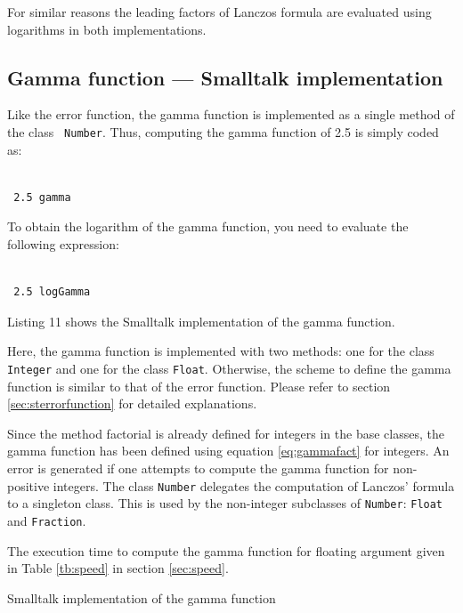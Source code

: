 \documentclass[twoside]{book}
\begin{document}
For similar reasons the leading factors of Lanczos formula are
evaluated using logarithms in both implementations.

\subsection{Gamma function --- Smalltalk implementation}
 Like the error function, the gamma
function is implemented as a single method of the class {\tt
Number}. Thus, computing the gamma function of 2.5 is simply coded
as:
\begin{codeExample}
\begin{verbatim}

 2.5 gamma
\end{verbatim}
\end{codeExample}
To obtain the logarithm of the gamma function, you need to
evaluate the following expression:
\begin{codeExample}
\begin{verbatim}

 2.5 logGamma
\end{verbatim}
\end{codeExample}
Listing 11 shows the Smalltalk implementation of the gamma
function.

Here, the gamma function is implemented with two methods: one for
the class {\tt Integer} and one for the class {\tt Float}.
Otherwise, the scheme to define the gamma function is similar to
that of the error function. Please refer to section
\ref{sec:sterrorfunction} for detailed explanations.

Since the method factorial is already defined for integers in the
base classes, the gamma function has been defined using equation
\ref{eq:gammafact} for integers. An error is generated if one
attempts to compute the gamma function for non-positive integers.
The class {\tt Number} delegates the computation of Lanczos'
formula to a singleton class. This is used by the non-integer
subclasses of {\tt Number}: {\tt Float} and {\tt Fraction}.

The execution time to compute the gamma function for floating
argument given in Table \ref{tb:speed} in section \ref{sec:speed}.
\begin{listing}
Smalltalk implementation of the gamma function
\label{ls:gammafunc}



\end{listing}
\end{document}
